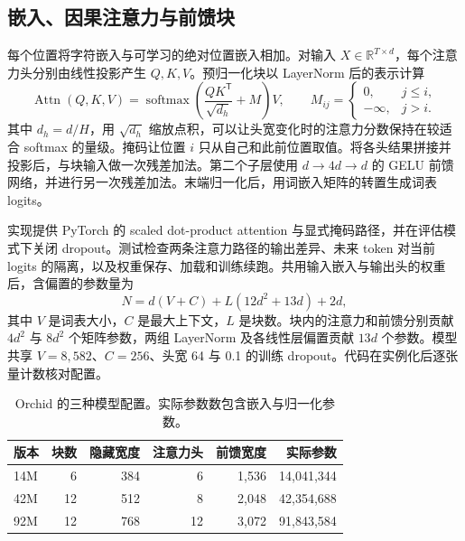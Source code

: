 \subsection{嵌入、因果注意力与前馈块}

每个位置将字符嵌入与可学习的绝对位置嵌入相加。对输入 $X\in\mathbb R^{T\times d}$，每个注意力头分别由线性投影产生 $Q,K,V$。预归一化块以 LayerNorm 后的表示计算
\begin{equation}
  \operatorname{Attn}(Q,K,V)
   = \operatorname{softmax}\left(\frac{QK^{\mathsf T}}{\sqrt{d_h}}+M\right)V,
  \qquad
  M_{ij}=
    \begin{cases}
      0,&j\le i,\\
      -\infty,&j>i.
    \end{cases}
\end{equation}
其中 $d_h=d/H$，用 $\sqrt{d_h}$ 缩放点积，可以让头宽变化时的注意力分数保持在较适合 softmax 的量级。掩码让位置 $i$ 只从自己和此前位置取值。将各头结果拼接并投影后，与块输入做一次残差加法。第二个子层使用 $d\to4d\to d$ 的 GELU 前馈网络，并进行另一次残差加法。末端归一化后，用词嵌入矩阵的转置生成词表 logits。


实现提供 PyTorch 的 scaled dot-product attention 与显式掩码路径，并在评估模式下关闭 dropout。测试检查两条注意力路径的输出差异、未来 token 对当前 logits 的隔离，以及权重保存、加载和训练续跑。共用输入嵌入与输出头的权重后，含偏置的参数量为
\begin{equation}
    N=d(V+C)+L(12d^2+13d)+2d,
\end{equation}
其中 $V$ 是词表大小，$C$ 是最大上下文，$L$ 是块数。块内的注意力和前馈分别贡献 $4d^2$ 与 $8d^2$ 个矩阵参数，两组 LayerNorm 及各线性层偏置贡献 $13d$ 个参数。模型共享 $V=8{,}582$、$C=256$、头宽 64 与 0.1 的训练 dropout。代码在实例化后逐张量计数核对配置。

\begin{table}[!htbp]
\centering
\caption{Orchid 的三种模型配置。实际参数数包含嵌入与归一化参数。}
\label{tab:model}
\begin{tabular}{@{}lrrrrr@{}}
\toprule
版本 & 块数 & 隐藏宽度 & 注意力头 & 前馈宽度 & 实际参数\\
\midrule
14M & 6 & 384 & 6 & 1,536 & 14,041,344\\
42M & 12 & 512 & 8 & 2,048 & 42,354,688\\
92M & 12 & 768 & 12 & 3,072 & 91,843,584\\
\bottomrule
\end{tabular}
\end{table}

